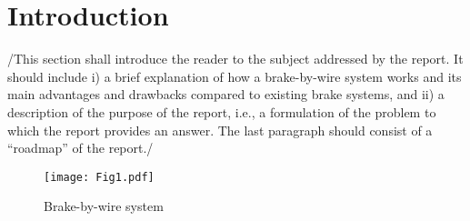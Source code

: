 \newpage
\section{Introduction}
/{This section shall introduce the reader to the subject addressed by the report. It should include i) a brief explanation of how a brake-by-wire system works and its main advantages and drawbacks compared to existing brake systems, and ii) a description of the purpose of the report, i.e., a formulation of the problem to which the report provides an answer. The last paragraph should consist of a “roadmap” of the report.}/
\begin{figure}[h!]
  \centering
  \texttt{[image: Fig1.pdf]}
  \caption{Brake-by-wire system}
  \label{fig1}
\end{figure}
